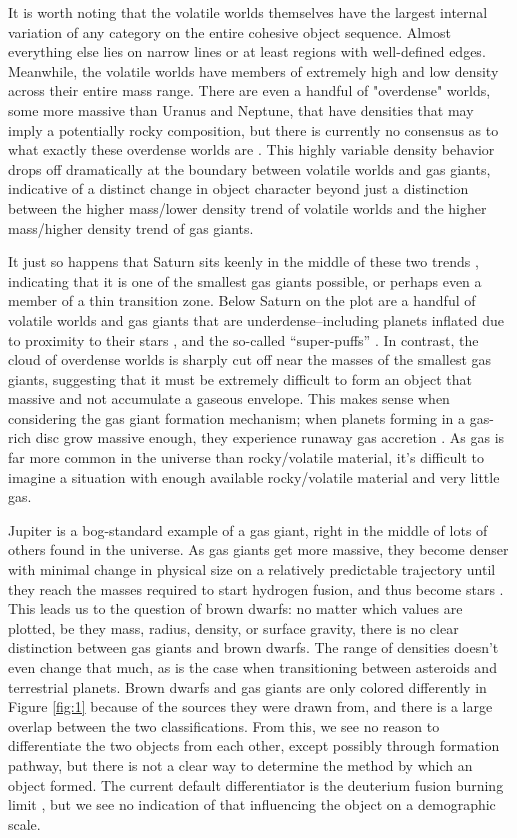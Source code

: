 \documentclass[twocolumn,linenumbers]{aastex631}
\begin{document}
It is worth noting that the volatile worlds themselves have the largest internal variation of any category on the entire cohesive object sequence. Almost everything else lies on narrow lines or at least regions with well-defined edges. Meanwhile, the volatile worlds have members of extremely high and low density across their entire mass range. There are even a handful of "overdense" worlds, some more massive than Uranus and Neptune, that have densities that may imply a potentially rocky composition, but there is currently no consensus as to what exactly these overdense worlds are \citep{Armstrong2020, Naponiello2023, Lange2024}. This highly variable density behavior drops off dramatically at the boundary between volatile worlds and gas giants, indicative of a distinct change in object character beyond just a distinction between the higher mass/lower density trend of volatile worlds and the higher mass/higher density trend of gas giants.

It just so happens that Saturn sits keenly in the middle of these two trends \citep{Ravit2023}, indicating that it is one of the smallest gas giants possible, or perhaps even a member of a thin transition zone. Below Saturn on the plot are a handful of volatile worlds and gas giants that are underdense--including planets inflated due to proximity to their stars \citep{Batygin2011}, and the so-called ``super-puffs'' \citep{Lee2016, Libby-Roberts2020}. In contrast, the cloud of overdense worlds is sharply cut off near the masses of the smallest gas giants, suggesting that it must be extremely difficult to form an object that massive and not accumulate a gaseous envelope. This makes sense when considering the gas giant formation mechanism; when planets forming in a gas-rich disc grow massive enough, they experience runaway gas accretion \citep{Bodenheimer1986, Venturini2016}. As gas is far more common in the universe than rocky/volatile material, it's difficult to imagine a situation with enough available rocky/volatile material and very little gas. 

Jupiter is a bog-standard example of a gas giant, right in the middle of lots of others found in the universe. As gas giants get more massive, they become denser with minimal change in physical size on a relatively predictable trajectory until they reach the masses required to start hydrogen fusion, and thus become stars \citep{Baraffe1998, Boetticher2017}. This leads us to the question of brown dwarfs: no matter which values are plotted, be they mass, radius, density, or surface gravity, there is no clear distinction between gas giants and brown dwarfs. The range of densities doesn't even change that much, as is the case when transitioning between asteroids and terrestrial planets. Brown dwarfs and gas giants are only colored differently in Figure \ref{fig:1} because of the sources they were drawn from, and there is a large overlap between the two classifications. From this, we see no reason to differentiate the two objects from each other, except possibly through formation pathway, but there is not a clear way to determine the method by which an object formed. The current default differentiator is the deuterium fusion burning limit \citep{Boss2007}, but we see no indication of that influencing the object on a demographic scale. 
\end{document}
